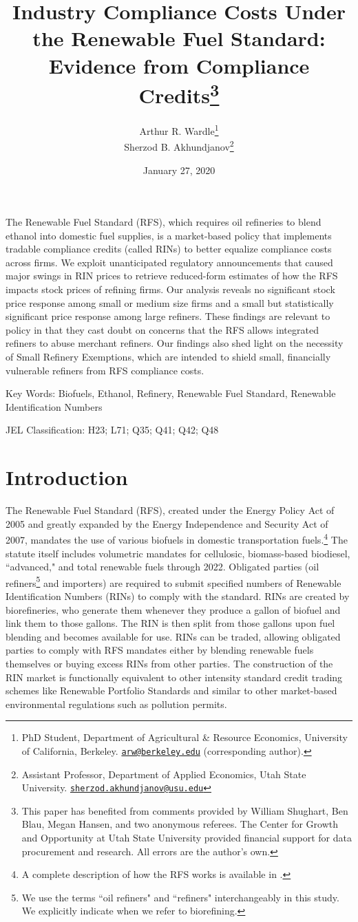 \documentclass[11pt]{article}
\title{{\Large \bf Industry Compliance Costs Under the Renewable Fuel Standard: Evidence from Compliance Credits\thanks{This paper has benefited from comments provided by William Shughart, Ben Blau, Megan Hansen, and two anonymous referees. The Center for Growth and Opportunity at Utah State University provided financial support for data procurement and research. All errors are the author's own.}}}
\author{Arthur R. Wardle\footnote{
PhD Student, Department of Agricultural \& Resource Economics, University of California, Berkeley. \href{mailto:arw@berkeley.edu}{\tt arw@berkeley.edu} (corresponding author).}\\
Sherzod B. Akhundjanov\footnote{Assistant Professor, Department of Applied Economics, Utah State University. \href{matilto:sherzod.akhundjanov@usu.edu}{\tt sherzod.akhundjanov@usu.edu}}}
\date{January 27, 2020}
\begin{document}
\maketitle

The Renewable Fuel Standard (RFS), which requires oil refineries to blend ethanol into domestic fuel supplies, is a market-based policy that implements tradable compliance credits (called RINs) to better equalize compliance costs across firms. We exploit unanticipated regulatory announcements that caused major swings in RIN prices to retrieve reduced-form estimates of how the RFS impacts stock prices of refining firms. Our analysis reveals no significant stock price response among small or medium size firms and a small but statistically significant price response among large refiners. These findings are relevant to policy in that they cast doubt on concerns that the RFS allows integrated refiners to abuse merchant refiners. Our findings also shed light on the necessity of Small Refinery Exemptions, which are intended to shield small, financially vulnerable refiners from RFS compliance costs.
\newline

{\small
Key Words: Biofuels, Ethanol, Refinery, Renewable Fuel Standard, Renewable Identification Numbers

JEL Classification: H23; L71; Q35; Q41; Q42; Q48}
\newpage

\section{Introduction}

The Renewable Fuel Standard (RFS), created under the Energy Policy Act of 2005 and greatly expanded by the Energy Independence and Security Act of 2007, mandates the use of various biofuels in domestic transportation fuels.\footnote{A complete description of how the RFS works is available in \cite{Schnepf2013}.} The statute itself includes volumetric mandates for cellulosic, biomass-based biodiesel, ``advanced," and total renewable fuels through 2022. Obligated parties (oil refiners\footnote{We use the terms  ``oil refiners" and ``refiners" interchangeably in this study. We explicitly indicate when we refer to biorefining.} and importers) are required to submit specified numbers of Renewable Identification Numbers (RINs) to comply with the standard. RINs are created by biorefineries, who generate them whenever they produce a gallon of biofuel and link them to those gallons. The RIN is then split from those gallons upon fuel blending and becomes available for use. RINs can be traded, allowing obligated parties to comply with RFS mandates either by blending renewable fuels themselves or buying excess RINs from other parties. The construction of the RIN market is functionally equivalent to other intensity standard credit trading schemes like Renewable Portfolio Standards and similar to other market-based environmental regulations such as pollution permits. 
\end{document}
